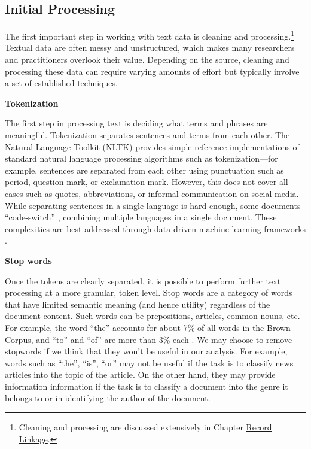 \documentclass[]{krantz}
\begin{document}
\subsection{Initial Processing}\label{initial-processing}

The first important step in working with text data is cleaning and
processing.\footnote{Cleaning and processing are discussed extensively
  in Chapter \protect\hyperlink{chap:link}{Record Linkage}.} Textual
data are often messy and unstructured, which makes many researchers and
practitioners overlook their value. Depending on the source, cleaning
and processing these data can require varying amounts of effort but
typically involve a set of established techniques.

\textbf{Tokenization}

The first step in processing text is deciding what terms and phrases are
meaningful. Tokenization separates sentences and terms from each other.
The Natural Language Toolkit (NLTK) \citep{bird-09} provides simple
reference implementations of standard natural language processing
algorithms such as tokenization---for example, sentences are separated
from each other using punctuation such as period, question mark, or
exclamation mark. However, this does not cover all cases such as quotes,
abbreviations, or informal communication on social media. While
separating sentences in a single language is hard enough, some documents
``code-switch'' \citep{molina-16}, combining multiple languages in a
single document. These complexities are best addressed through
data-driven machine learning frameworks \citep{kiss-06}.

\textbf{Stop words}

Once the tokens are clearly separated, it is possible to perform further
text processing at a more granular, token level. Stop words are a
category of words that have limited semantic meaning (and hence utility)
regardless of the document content. Such words can be prepositions,
articles, common nouns, etc. For example, the word ``the'' accounts for
about 7\% of all words in the Brown Corpus, and ``to'' and ``of'' are
more than 3\% each \citep{malmkjar-02}. We may choose to remove
stopwords if we think that they won't be useful in our analysis. For
example, words such as ``the'', ``is'', ``or'' may not be useful if the
task is to classify news articles into the topic of the article. On the
other hand, they may provide information information if the task is to
classify a document into the genre it belongs to or in identifying the
author of the document.
\end{document}
